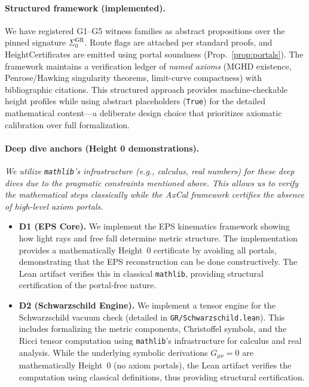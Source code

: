 \documentclass[11pt]{article}
\theoremstyle{definition}
\theoremstyle{remark}
\begin{document}
\paragraph{Structured framework (implemented).} We have registered G1--G5 witness families as abstract propositions over the pinned signature $\Sigma_0^{\mathrm{GR}}$. Route flags are attached per standard proofs, and HeightCertificates are emitted using portal soundness (Prop.~\ref{prop:portals}). The framework maintains a verification ledger of \emph{named axioms} (MGHD existence, Penrose/Hawking singularity theorems, limit-curve compactness) with bibliographic citations. This structured approach provides machine-checkable height profiles while using abstract placeholders (\texttt{True}) for the detailed mathematical content---a deliberate design choice that prioritizes axiomatic calibration over full formalization.

\paragraph{Deep dive anchors (Height 0 demonstrations).}
\emph{We utilize \texttt{mathlib}'s infrastructure (e.g., calculus, real numbers) for these deep dives due to the pragmatic constraints mentioned above. This allows us to verify the mathematical steps classically while the AxCal framework certifies the absence of high-level axiom portals.}
\begin{itemize}
\item \textbf{D1 (EPS Core).} We implement the EPS kinematics framework showing how light rays and free fall determine metric structure. The implementation provides a mathematically Height~0 certificate by avoiding all portals, demonstrating that the EPS reconstruction can be done constructively. The Lean artifact verifies this in classical \texttt{mathlib}, providing structural certification of the portal‑free nature.
\item \textbf{D2 (Schwarzschild Engine).} We implement a tensor engine for the Schwarzschild vacuum check (detailed in \texttt{GR/Schwarzschild.lean}). This includes formalizing the metric components, Christoffel symbols, and the Ricci tensor computation using \texttt{mathlib}'s infrastructure for calculus and real analysis. While the underlying symbolic derivations $G_{\mu\nu}=0$ are mathematically Height~0 (no axiom portals), the Lean artifact verifies the computation using classical definitions, thus providing structural certification.
\end{itemize}
\end{document}

